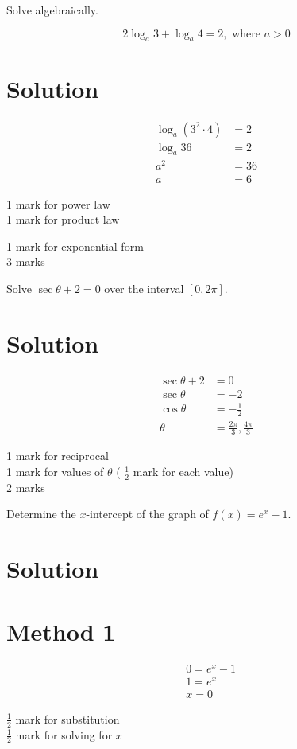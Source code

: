 \documentclass[10pt]{article}
\begin{document}
Solve algebraically.

$$
2 \log _{a} 3+\log _{a} 4=2, \text { where } a>0
$$

\section*{Solution}
$$
\begin{aligned}
\log _{a}\left(3^{2} \cdot 4\right) & =2 \\
\log _{a} 36 & =2 \\
a^{2} & =36 \\
a & =6
\end{aligned}
$$

1 mark for power law\\
1 mark for product law

1 mark for exponential form\\
3 marks

Solve $\sec \theta+2=0$ over the interval $[0,2 \pi]$.

\section*{Solution}
$$
\begin{aligned}
\sec \theta+2 & =0 \\
\sec \theta & =-2 \\
\cos \theta & =-\frac{1}{2} \\
\theta & =\frac{2 \pi}{3}, \frac{4 \pi}{3}
\end{aligned}
$$

1 mark for reciprocal\\
1 mark for values of $\theta$ ( $\frac{1}{2}$ mark for each value)\\
2 marks

Determine the $x$-intercept of the graph of $f(x)=e^{x}-1$.

\section*{Solution}
\section*{Method 1}
$$
\begin{aligned}
& 0=e^{x}-1 \\
& 1=e^{x} \\
& x=0
\end{aligned}
$$

$\frac{1}{2}$ mark for substitution\\
$\frac{1}{2}$ mark for solving for $x$
\end{document}
